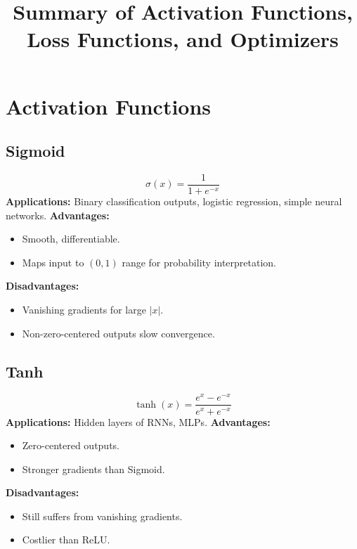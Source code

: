 \documentclass[11pt]{article}
\begin{document}
\title{Summary of Activation Functions, Loss Functions, and Optimizers}
\author{}
\date{}
\maketitle


\tableofcontents
\listoffigures
\listoftables
\cleardoublepage
{}



\section{Activation Functions}

\subsection{Sigmoid}
\[
\sigma(x) = \frac{1}{1 + e^{-x}}
\]
\textbf{Applications:} Binary classification outputs, logistic regression, simple neural networks.  
\textbf{Advantages:}
\begin{itemize}
\item Smooth, differentiable.
\item Maps input to $(0,1)$ range for probability interpretation.
\end{itemize}
\textbf{Disadvantages:}
\begin{itemize}
\item Vanishing gradients for large $|x|$.
\item Non-zero-centered outputs slow convergence.
\end{itemize}

\subsection{Tanh}
\[
\tanh(x) = \frac{e^{x} - e^{-x}}{e^{x} + e^{-x}}
\]
\textbf{Applications:} Hidden layers of RNNs, MLPs.  
\textbf{Advantages:}
\begin{itemize}
\item Zero-centered outputs.
\item Stronger gradients than Sigmoid.
\end{itemize}
\textbf{Disadvantages:}
\begin{itemize}
\item Still suffers from vanishing gradients.
\item Costlier than ReLU.
\end{itemize}
\end{document}

